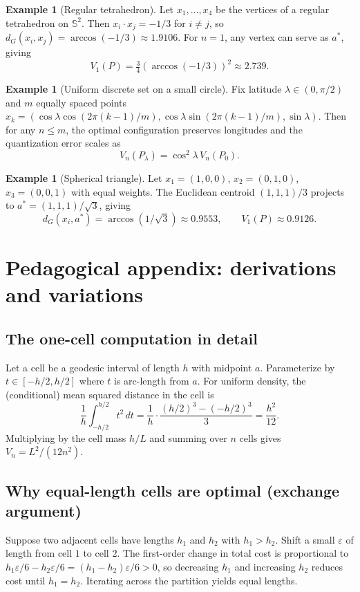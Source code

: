 \documentclass[12pt, reqno]{amsart}
\theoremstyle{plain}
\theoremstyle{definition}
\newtheorem{exam}[subsection]{Example}
\newcommand{\D}[1]{\mathbb{#1}}%
\begin{document}
\begin{exam}[Regular tetrahedron]
Let $x_1,\dots,x_4$ be the vertices of a regular tetrahedron on $\D S^2$.
Then $x_i\cdot x_j=-1/3$ for $i\neq j$, so $d_G(x_i,x_j)=\arccos(-1/3)\approx1.9106$.
For $n=1$, any vertex can serve as $a^*$, giving
\[
V_1(P)=\tfrac34(\arccos(-1/3))^2\approx2.739.
\]
\end{exam}

\begin{exam}[Uniform discrete set on a small circle]
Fix latitude $\lambda\in(0,\pi/2)$ and $m$ equally spaced points
$x_k=(\cos\lambda\cos(2\pi(k-1)/m),\cos\lambda\sin(2\pi(k-1)/m),\sin\lambda)$.
Then for any $n\le m$, the optimal configuration preserves longitudes
and the quantization error scales as
\[
V_n(P_\lambda)=\cos^2\lambda\,V_n(P_0).
\]
\end{exam}

\begin{exam}[Spherical triangle]
Let $x_1=(1,0,0)$, $x_2=(0,1,0)$, $x_3=(0,0,1)$ with equal weights.
The Euclidean centroid $(1,1,1)/3$ projects to
$a^*=(1,1,1)/\sqrt3$, giving
\[
d_G(x_i,a^*)=\arccos(1/\sqrt3)\approx0.9553,\qquad
V_1(P)\approx0.9126.
\]
\end{exam}


\section{Pedagogical appendix: derivations and variations}

\subsection{The one-cell computation in detail}
Let a cell be a geodesic interval of length $h$ with midpoint $a$. Parameterize by $t\in[-h/2,h/2]$ where $t$ is arc-length from $a$. For uniform density, the (conditional) mean squared distance in the cell is
\[
\frac{1}{h}\int_{-h/2}^{h/2} t^2\,dt = \frac{1}{h}\cdot \frac{(h/2)^3-( -h/2)^3}{3} = \frac{h^2}{12}.
\]
Multiplying by the cell mass $h/L$ and summing over $n$ cells gives $V_n=L^2/(12n^2)$.

\subsection{Why equal-length cells are optimal (exchange argument)}
Suppose two adjacent cells have lengths $h_1$ and $h_2$ with $h_1>h_2$. Shift a small $\varepsilon$ of length from cell $1$ to cell $2$. The first-order change in total cost is proportional to $h_1\varepsilon/6 - h_2\varepsilon/6 = (h_1-h_2)\varepsilon/6>0$, so decreasing $h_1$ and increasing $h_2$ reduces cost until $h_1=h_2$. Iterating across the partition yields equal lengths.
\end{document}
